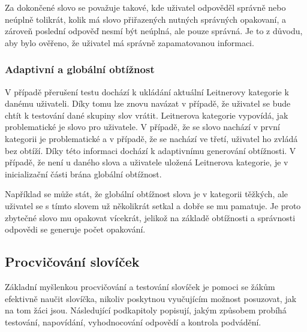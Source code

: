 \documentclass[a4paper,11pt,titlepage,fleqn]{article}
\begin{document}
            Za dokončené slovo se považuje takové, kde uživatel odpověděl správně nebo neúplně tolikrát, kolik má slovo přiřazených nutných správných opakovaní, a zároveň poslední odpověď nesmí být neúplná, ale pouze správná. Je to z důvodu, aby bylo ověřeno, že uživatel má správně zapamatovanou informaci.


        \subsubsection{Adaptivní a globální obtížnost}      
            V případě přerušení testu dochází k ukládání aktuální Leitnerovy kategorie k danému uživateli. Díky tomu lze znovu navázat v případě, že uživatel se bude chtít k testování dané skupiny slov vrátit. Leitnerova kategorie vypovídá, jak problematické je slovo pro uživatele. V případě, že se slovo nachází v první kategorii je problematické a v případě, že se nachází ve třetí, uživatel ho zvládá bez obtíží. Díky této informaci dochází k adaptivnímu generování obtížnosti. V případě, že není u daného slova a uživatele uložená Leitnerova kategorie, je v inicializační části brána globální obtížnost.

            Například se může stát, že globální obtížnost slova je v kategorii těžkých, ale uživatel se s tímto slovem už několikrát setkal a dobře se mu pamatuje. Je proto zbytečné slovo mu opakovat vícekrát, jelikož na základě obtížnosti a správnosti odpovědi se generuje počet opakování. 

    \subsection{Procvičování slovíček}
        Základní myšlenkou procvičování a testování slovíček je pomoci se žákům efektivně naučit slovíčka, nikoliv poskytnou vyučujícím možnost posuzovat, jak na tom žáci jsou. Následující podkapitoly popisují, jakým způsobem probíhá testování, napovídání, vyhodnocování odpovědí a kontrola podvádění.
\end{document}
